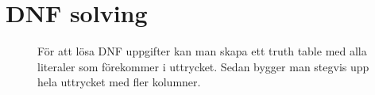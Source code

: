 \documentclass[a5paper]{article}
\begin{document}
\section*{DNF solving}
\begin{figure}[ht]
	\centering
	\caption*{För att lösa DNF uppgifter kan man skapa ett truth table med alla literaler som förekommer i uttrycket.
		Sedan bygger man stegvis upp hela uttrycket med fler kolumner.
	}\label{fig:2018-5-1}
\end{figure}
\end{document}
